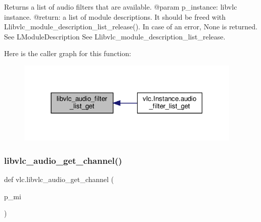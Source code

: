 \begin{DoxyVerb}Returns a list of audio filters that are available.
@param p_instance: libvlc instance.
@return: a list of module descriptions. It should be freed with L{libvlc_module_description_list_release}(). In case of an error, None is returned. See L{ModuleDescription} See L{libvlc_module_description_list_release}.
\end{DoxyVerb}
 Here is the caller graph for this function\+:
\nopagebreak
\begin{figure}[H]
\begin{center}
\leavevmode
\includegraphics[width=304pt]{namespacevlc_aff772ccc6681b4466b87298f076e20f5_icgraph}
\end{center}
\end{figure}
\mbox{\label{namespacevlc_aaea673f933311af160dd682a91e0cd89}} 
\subsubsection{\texorpdfstring{libvlc\+\_\+audio\+\_\+get\+\_\+channel()}{libvlc\_audio\_get\_channel()}}
{\footnotesize\ttfamily def vlc.\+libvlc\+\_\+audio\+\_\+get\+\_\+channel (\begin{DoxyParamCaption}\item[{}]{p\+\_\+mi }\end{DoxyParamCaption})}

